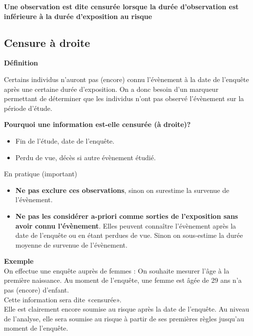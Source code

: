 \documentclass[
  12pt,
  letterpaper,
  DIV=11,
  numbers=noendperiod,
  onepage,
  openany]{scrreprt}
\providecommand{\tightlist}{%
  \setlength{\itemsep}{0pt}\setlength{\parskip}{0pt}}\usepackage{longtable,booktabs,array}
\begin{document}
\begin{tcolorbox}[enhanced jigsaw, arc=.35mm, bottomrule=.15mm, titlerule=0mm, colbacktitle=quarto-callout-important-color!10!white, left=2mm, opacitybacktitle=0.6, toprule=.15mm, title=\textcolor{quarto-callout-important-color}{\faExclamation}\hspace{0.5em}{Important}, colframe=quarto-callout-important-color-frame, breakable, coltitle=black, opacityback=0, toptitle=1mm, bottomtitle=1mm, rightrule=.15mm, leftrule=.75mm, colback=white]

\textbf{Une observation est dite censurée lorsque la durée d'observation
est inférieure à la durée d'exposition au risque}

\end{tcolorbox}

\hypertarget{censure-uxe0-droite}{%
\subsection{Censure à droite}\label{censure-uxe0-droite}}

\textbf{Définition}

Certains individus n'auront pas (encore) connu l'évènement à la date de
l'enquête après une certaine durée d'exposition. On a donc besoin d'un
marqueur permettant de déterminer que les individus n'ont pas observé
l'évènement sur la période d'étude.

\textbf{Pourquoi une information est-elle censurée (à droite)?}

\begin{itemize}
\tightlist
\item
  Fin de l'étude, date de l'enquête.
\item
  Perdu de vue, décès si autre évènement étudié.
\end{itemize}

En pratique (important)

\begin{itemize}
\tightlist
\item
  \textbf{Ne pas exclure ces observations}, sinon on surestime la
  survenue de l'évènement.
\item
  \textbf{Ne pas les considérer a-priori comme sorties de l'exposition
  sans avoir connu l'évènement}. Elles peuvent connaître l'évènement
  après la date de l'enquête ou en étant perdues de vue. Sinon on
  sous-estime la durée moyenne de survenue de l'évènement.
\end{itemize}

\textbf{Exemple}\\
On effectue une enquête auprès de femmes : On souhaite mesurer l'âge à
la première naissance. Au moment de l'enquête, une femme est âgée de 29
ans n'a pas (encore) d'enfant.\\
Cette information sera dite «censurée».\\
Elle est clairement encore soumise au risque après la date de l'enquête.
Au niveau de l'analyse, elle sera soumise au risque à partir de ses
premières règles jusqu'au moment de l'enquête.
\end{document}
